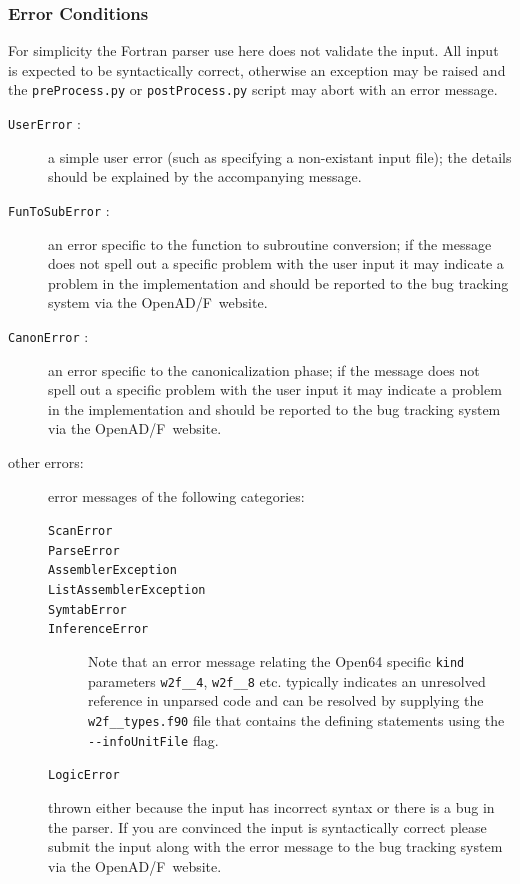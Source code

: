\documentclass{book}
\newcommand{\OpenADF}{OpenAD/F}
\begin{document}
\subsubsection{Error Conditions}\label{sec:canonErrors}
For simplicity the Fortran parser use here does not validate the input. 
All input is expected to be syntactically correct, otherwise an exception
may be raised and the \lstinline{preProcess.py} or 
\lstinline{postProcess.py} script may abort with an error message.  
\begin{description}
\item[{\tt UserError} : ] a simple user error (such as specifying a non-existant input file); the 
details  should be explained by the accompanying message. 
\item[{\tt FunToSubError} : ] an error specific to the function to subroutine 
conversion; 
if the message does not spell out a specific problem with the user input it may indicate a 
problem in the implementation and should be reported to the bug tracking system via the \OpenADF\ website.
\item[{\tt CanonError} : ] an error specific to the canonicalization phase; 
if the message does not spell out a specific problem with the user input it may indicate a 
problem in the implementation and should be reported to the bug tracking system via the \OpenADF\ website.
\item[other errors:] error messages of the following categories:
\begin{description}
\item[{\tt ScanError}]
\item[{\tt ParseError}]
\item[{\tt AssemblerException}]
\item[{\tt ListAssemblerException}]
\item[{\tt SymtabError}]
\item[{\tt InferenceError}] Note that an error message relating the Open64 specific \lstinline{kind} parameters 
\lstinline{w2f__4}, \lstinline{w2f__8} etc. typically indicates an unresolved reference in unparsed code and can be 
resolved by supplying the \lstinline{w2f__types.f90} file that contains the defining statements  using the 
\lstinline{--infoUnitFile} flag. 
\item[{\tt LogicError}]
\end{description}
thrown either because the input has incorrect syntax or there is a bug in the parser. 
If you are convinced the input is syntactically correct please submit the input along with 
the error message to the bug tracking system via the \OpenADF\ website. 
\end{description}
\end{document}
